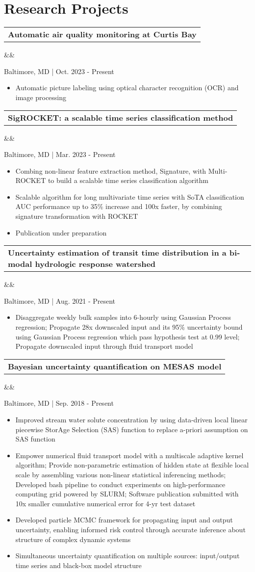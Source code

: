 \documentclass[12pt,letterpaper,sans]{moderncv}        %
\makeatletter
\newcommand*{\customcvproject}[4][.25em]{
  \begin{tabular}{@{}l} 
    {\bfseries #2} { #3}
  \end{tabular}


      

  \ifx&#4&%
  \else{\\%
    \begin{minipage}{\maincolumnwidth}%
      \small#4%
    \end{minipage}}\fi%
  \par\addvspace{#1}}
\makeatother
\begin{document}
{\section{Research Projects}
 
{\customcvproject{Automatic air quality monitoring at Curtis Bay}{}{}}
Baltimore, MD | Oct. 2023 - Present
\begin{itemize}
\item Automatic picture labeling using optical character recognition (OCR) and image processing
 \end{itemize}

{\customcvproject{SigROCKET: a scalable time series classification method}{}{}}
Baltimore, MD | Mar. 2023 - Present
\begin{itemize}
\item Combing non-linear feature extraction method, Signature, with Multi-ROCKET to build a scalable time series classification algorithm
\item Scalable algorithm for long multivariate time series with SoTA classification AUC performance up to 35\% increase and 100x faster, by combining signature transformation with ROCKET
\item Publication under preparation
\end{itemize}

 
{\customcvproject{Uncertainty estimation of transit time distribution in a bi-modal hydrologic response watershed}{}{}}
Baltimore, MD | Aug. 2021 - Present 
\begin{itemize}
\item Disaggregate weekly bulk samples into 6-hourly using Gaussian Process regression; Propagate 28x downscaled input and its 95\% uncertainty bound using Gaussian Process regression which pass hypothesis test at 0.99 level; Propagate downscaled input through fluid transport model
\end{itemize}

{\customcvproject{Bayesian uncertainty quantification on MESAS model}{}
{}}
Baltimore, MD | Sep. 2018 - Present
\begin{itemize}
\item Improved stream water solute concentration by using data-driven local linear piecewise StorAge Selection (SAS) function to replace a-priori assumption on SAS function
\item Empower numerical fluid transport model with a multiscale adaptive kernel algorithm; Provide non-parametric estimation of hidden state at flexible local scale by assembling various non-linear statistical inferencing methods; Developed bash pipeline to conduct experiments on high-performance computing grid powered by SLURM; Software publication submitted with 10x smaller cumulative numerical error for 4-yr test dataset \cite{harman2022mesas}
\item Developed particle MCMC framework for propagating input and output uncertainty, enabling informed risk control through accurate inference about structure of complex dynamic systems
\item Simultaneous uncertainty quantification on multiple sources: input/output time series and black-box model structure



\end{itemize}}
\end{document}
